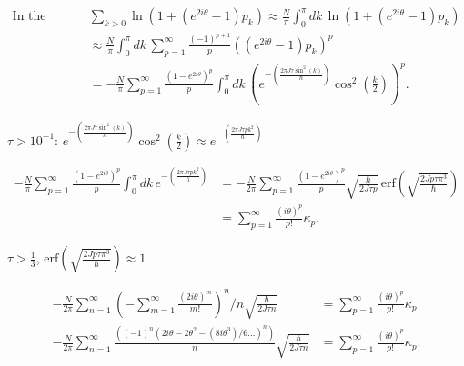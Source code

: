 \documentclass{article}
\begin{document}
\begin{align*}
    \text{In the continuum limit:} \, & \sum_{k>0}\ln(1+(e^{2i\theta}-1) p_k ) \approx \frac{N}{\pi} \int_0^{\pi} dk \, \ln(1+(e^{2i\theta}-1) p_k )                                                                              \\
                                      & \approx \frac{N}{\pi} \int_0^{\pi} dk \, \sum_{p=1}^{\infty} \frac{(-1)^{p+1}}{p} ((e^{2i\theta}-1) p_k )^p                                                                               \\
                                      & = -\frac{N}{\pi} \sum_{p=1}^{\infty}\frac{(1-e^{2i\theta})^p}{p} \int_0^{\pi} dk \, \left(e^{-\left(\frac{2\pi J\tau \sin^2 (k)}{\hbar}\right)} \cos^2 \left(\frac{k}{2}\right)\right)^p.
\end{align*}

 $\tau > 10^{-1} : \, e^{-\left(\frac{2\pi J\tau \sin^2 (k)}{\hbar}\right)} \cos^2 \left(\frac{k}{2}\right) \approx e^{-\left(\frac{2\pi J\tau p k^2}{\hbar}\right)}$

\begin{align*}
    -\frac{N}{\pi} \sum_{p=1}^{\infty}\frac{(1-e^{2i\theta})^p}{p} \int_0^{\pi} dk \, e^{-\left(\frac{2\pi J\tau p k^2}{\hbar}\right)} & = -\frac{N}{2\pi} \sum_{p=1}^{\infty}\frac{(1-e^{2i\theta})^p}{p} \sqrt{\frac{\hbar}{2J\tau p}} \, \text{erf}\left(\sqrt{\frac{2J p \tau \pi^3}{\hbar}}\right) \\
                                                                                                                                       & = \sum_{p=1}^{\infty} \frac{(i\theta)^p}{p!} \kappa_p.
\end{align*}

 $\tau > \frac{1}{3}$, $\text{erf}\left(\sqrt{\frac{2J p \tau \pi^3}{\hbar}}\right) \approx 1$ \, 

\begin{align*}
    -\frac{N}{2\pi} \sum_{n=1}^{\infty} \left(-\sum_{m=1}^{\infty}\frac{(2i\theta)^m}{m!}\right)^n/n \sqrt{\frac{\hbar}{2J\tau n}}   & = \sum_{p=1}^{\infty} \frac{(i\theta)^p}{p!} \kappa_p  \\
    -\frac{N}{2\pi} \sum_{n=1}^{\infty} \frac{((-1)^n (2i\theta-2\theta^2-(8i\theta^3)/6\ldots)^n)}{n} \sqrt{\frac{\hbar}{2J\tau n}} & = \sum_{p=1}^{\infty} \frac{(i\theta)^p}{p!} \kappa_p.
\end{align*}
\end{document}
